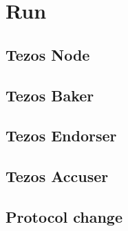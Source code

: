 \documentclass[a4paper,twocolumn,10pt]{article}
\begin{document}
\section{Run}
\subsection{Tezos Node}
\subsection{Tezos Baker}
\subsection{Tezos Endorser}
\subsection{Tezos Accuser}
\subsection{Protocol change}
\end{document}
